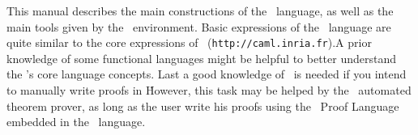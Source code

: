 This manual describes the main constructions of the \focal\ language,
as well as the main tools given by the \focal\ environment. Basic
expressions of the \focal\ language are quite similar to the core
expressions of \ocaml\
({\tt http://caml.inria.fr}).A prior knowledge of some functional
languages might be helpful to better understand the \focal's core
language concepts. Last a good knowledge of \coq\ is needed if you
intend to manually write proofs in \focal\. However, this task may be
helped by the \zenon\ automated theorem prover, as long as the user
write his proofs using the \focal\ Proof Language embedded in the
\focal\ language.
